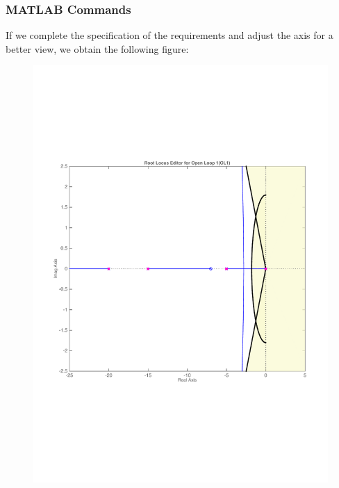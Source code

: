 \begin{frame}
\frametitle{MATLAB Commands}
	\begin{exampleblock}{}
		If we complete the specification of the requirements and adjust the axis for a better view, we obtain the following figure:
		\begin{figure}
			\centering
			\includegraphics[width=0.5\linewidth]{matlab_ex6}
		\end{figure}
	\end{exampleblock}
\end{frame}
